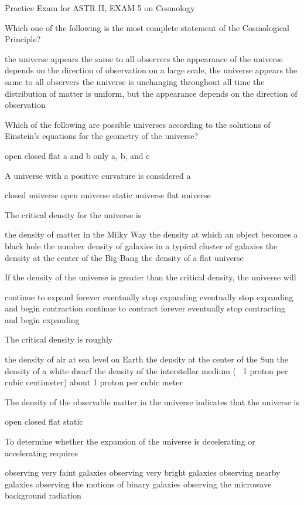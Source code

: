 Practice Exam for ASTR II,  EXAM 5 on Cosmology


Which one of the following is the most complete statement of the Cosmological Principle?

    the universe appears the same to all observers
    the appearance of the universe depends on the direction of observation
    on a large scale, the universe appears the same to all observers
    the universe is unchanging throughout all time
    the distribution of matter is uniform, but the appearance depends on the direction of observation

Which of the following are possible universes according to the solutions of Einstein’s equations for the geometry of the universe?

    open
    closed
    flat
    a and b only
    a, b, and c

A universe with a positive curvature is considered a

    closed universe
    open universe
    static universe
    flat universe

The critical density for the universe is

    the density of matter in the Milky Way
    the density at which an object becomes a black hole
    the number density of galaxies in a typical cluster of galaxies
    the density at the center of the Big Bang
    the density of a flat universe

If the density of the universe is greater than the critical density, the universe will

    continue to expand forever
    eventually stop expanding
    eventually stop expanding and begin contraction
    continue to contract forever
    eventually stop contracting and begin expanding

The critical density is roughly

    the density of air at sea level on Earth
    the density at the center of the Sun
    the density of a white dwarf
    the density of the interstellar medium (~ 1 proton per cubic centimeter)
    about 1 proton per cubic meter

The density of the observable matter in the universe indicates that the universe is

    open
    closed
    flat
    static

To determine whether the expansion of the universe is decelerating or accelerating requires

    observing very faint galaxies
    observing very bright galaxies
    observing nearby galaxies
    observing the motions of binary galaxies
    observing the microwave background radiation

